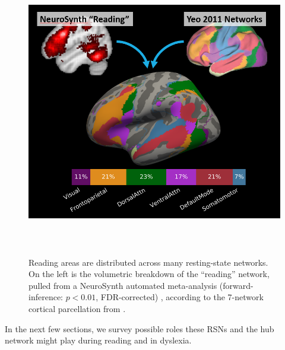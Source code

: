\begin{figure}[t]
\centering
\includegraphics[height=5in]{images/ch1-yeo-to-neurosynth.png}
    \caption[Reading areas are distributed across many resting-state networks]{Reading areas are distributed across many resting-state networks. On the left is the volumetric breakdown of the ``reading'' network, pulled from a NeuroSynth automated meta-analysis (forward-inference: $p < 0.01$, FDR-corrected) \citep{Yarkoni2011}, according to the 7-network cortical parcellation from \cite{Yeo2011}.}
    \label{fig:ch1-yeo-to-neurosynth}
\end{figure}

In the next few sections, we survey possible roles these RSNs and the hub network might play during reading and in dyslexia.


